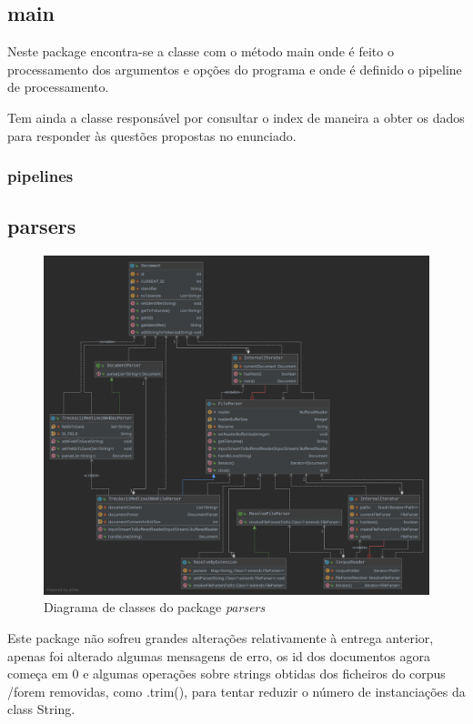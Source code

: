 \documentclass[12pt]{article}
\begin{document}
\subsection{main}

Neste package encontra-se a classe com o método main onde é feito o
processamento dos argumentos e opções do programa e onde é definido o
pipeline de processamento.

Tem ainda a classe responsável por consultar o index de maneira a
obter os dados para responder às questões propostas no enunciado.

\subsubsection{pipelines}

\subsection{parsers}
\begin{figure}[H]
  \center
  \includegraphics[width=12cm]{packages_parsers}
  \caption{Diagrama de classes do package \it parsers}
\end{figure}

Este package não sofreu grandes alterações relativamente à entrega
anterior, apenas foi alterado algumas mensagens de erro, os id dos
documentos agora começa em 0 e algumas operações sobre strings
obtidas dos ficheiros do corpus /forem removidas, como .trim(), para
tentar reduzir o número de instanciações da class String.
\end{document}
